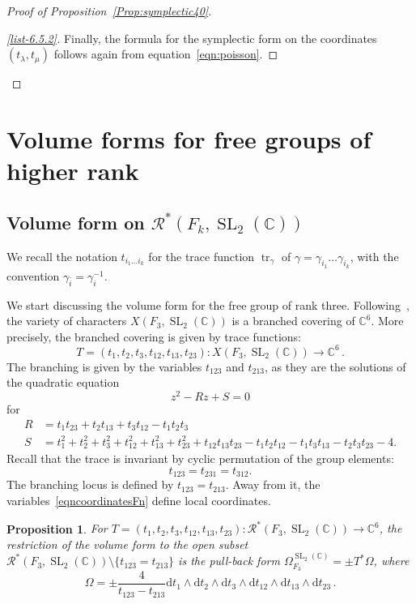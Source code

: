 \documentclass[11pt]{article}
\newtheorem{prop}[theo]{Proposition}
\theoremstyle{definition}
\newenvironment{proofc}{\begin{proof}}{\end{proof}}
\numberwithin{equation}{section}
\numberwithin{figure}{section}
\numberwithin{table}{section}
\DeclareMathOperator{\SL}{SL}
\DeclareMathOperator{\tr}{tr}
\newcommand{\Rcal}{\mathcal{R}}
\newcommand{\Cbb}{\mathbb{C}}
\newcommand*{\dd}{\mathrm{d}}
\begin{document}
\begin{proofc}[Proof of Proposition~\ref{Prop:symplectic40}]
\begin{proof}[\eqref{list-6.5.2}]
Finally, the formula for the symplectic form on the coordinates $(t_\lambda,t_\mu)$ follows again from equation~\eqref{eqn:poisson}.
\end{proof}
\let\qed\relax
\end{proofc}



\section{Volume forms for free groups of higher rank}\label{section:higherrank}


\subsection{Volume form on \texorpdfstring{$\Rcal^*(F_k,\SL_2(\Cbb)) $}{R*(Fk, SL2) }}


We recall the notation $t_{i_1\dots i_k}$ for the trace function $\tr_\gamma$ of $\gamma=\gamma_{i_1}\dots \gamma_{i_k}$, with the convention $\gamma_{\bar i}=\gamma_i ^{-1}$.

We start discussing the volume form for the free group of rank three. Following~\cite{AcunaMontesinos}, the variety of characters $X(F_3,\SL_2(\Cbb))$ is a branched covering of $\Cbb^{6}$. More precisely, the branched covering is given by trace functions:
\begin{equation}\label{eqncoordinatesFn}
T = (t_1, t_2, t_{3}, t_{12}, t_{13}, t_{23})\colon X(F_3,\SL_2(\Cbb))\to \Cbb^{6}\,.
\end{equation}
The branching is given by the variables $t_{123}$ and $t_{213}$, as they are the solutions of the quadratic equation
\[
z^2-R z+S=0
\]
for
\begin{align}\label{eqn:P}
R &= t_1 t_{23} + t_2 t_{13} + t_3 t_{12}- t_1 t_2 t_3 \\\label{eqn:Q}
S &= t_1^2+t_2^2+t_3^2+t_{12}^2+t_{13}^2+t_{23}^2+t_{12}t_{13}t_{23}- t_1t_2t_{12}- t_1t_3t_{13}- t_2t_3t_{23}-4.
\end{align}
Recall that the trace is invariant by cyclic permutation of the group elements:
\[
t_{123}=t_{231}=t_{312}.
\]
The branching locus is defined by $t_{123}= t_{213}$. Away from it, the variables~\eqref{eqncoordinatesFn} define local coordinates.


\begin{prop}\label{Prop:volFn}
For $T = (t_1, t_2, t_{3}, t_{12}, t_{13}, t_{23})\colon \Rcal^*(F_3,\SL_2(\Cbb))\to \Cbb^{6}$,
the restriction of the volume form to the open subset $\Rcal^*(F_3,\SL_2(\Cbb))\setminus\{ t_{123}= t_{213}\}$ is the pull-back form $ \Omega^{\SL_2(\Cbb)}_{F_3}=\pm T^*\Omega$, where
\begin{equation}\label{eqn:OmegaF3}
\Omega = \pm \frac{4}{t_{123}-t_{213} } \dd t_1 \wedge \dd t_2 \wedge \dd t_3 \wedge \dd t_{12}
\wedge \dd t_{13} \wedge \dd t_{23} \,.
\end{equation}
\end{prop}
\end{document}

